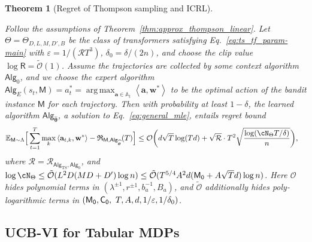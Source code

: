 \documentclass[10pt]{article}
\newtheorem{theorem}{Theorem}
\newcommand{\eps}{\varepsilon}
\DeclareMathOperator*{\argmax}{arg\,max}
\renewcommand{\cO}{\mathcal{O}}
\newcommand{\<}{\left\langle}
\renewcommand{\>}{\right\rangle}
\newcommand{\E}{\mathbb{E}}
\newcommand{\inst}{{\mathsf{M}}}
\newcommand{\TS}{{\mathrm{TS}}}
\newcommand{\Tpspar}{{\lambda}}
\newcommand{\Tpsparn}{{r}}
\newcommand{\tcO}{{\tilde{\mathcal O}}}
\newcommand{\state}{{s}}
\newcommand{\action}{{a}}
\newcommand{\totlen}{{T}}
\newcommand{\sAlg}{{\mathsf{Alg}}}
\newcommand{\Numobs}{{n}}
\newcommand{\Parspace}{{\Theta}}
\newcommand{\esttfpar}{{\widehat{\btheta}}}
\newcommand{\prior}{{\Lambda}}
\newcommand{\shortexp}{{E}}
\newcommand{\layer}{{L}}
\newcommand{\hidden}{{D'}}
\newcommand{\head}{{M}}
\newcommand{\clipval}{{\mathsf{R}}}
\newcommand{\embd}{{D}}
\newcommand{\totreward}{{\mathfrak{R}}}
\newcommand{\distratio}{{\mathcal{R}}}
\newcommand{\Numact}{{A}}
\newcommand{\neuron}{{\mathsf{M_0}}}
\newcommand{\weightn}{{{\mathsf{C_0}}}}
\def\sA{{\mathbb{A}}}
\def\btheta{{\boldsymbol \theta}}
\def\ba{{\mathbf a}}
\def\bw{{\mathbf w}}
\begin{document}
\begin{theorem}
[Regret of Thompson sampling and ICRL]\label{thm:ts_linear_regret}





Follow the assumptions of Theorem~\ref{thm:approx_thompson_linear}. Let $\Theta = \Theta_{D, L, M, \hidden, B}$ be the class of transformers satisfying Eq.~\eqref{eq:ts_tf_param-main} with $\eps=1/(\distratio\totlen^3)$,   $\delta_0=\delta/(2n)$, and choose the clip value $\log \clipval = \tcO(1)$. Assume the trajectories are collected by some context algorithm $\sAlg_0$, and we choose the expert algorithm $\sAlg_\shortexp(\state_t,\inst)=\action^*_t=\argmax_{\ba\in\sA_t}\<\ba,\bw^*\>$ to be the optimal action of the bandit instance $\inst$ for each trajectory. Then with probability at least $1-\delta$, the learned algorithm $\sAlg_{\esttfpar}$, a solution to Eq.~\eqref{eq:general_mle}, entails regret bound
\begin{align*}
\E_{\inst\sim\prior}\Big[\sum_{t=1}^\totlen\max_{k}\<\ba_{t,k},\bw^*\>-\totreward_{\inst,\sAlg_\esttfpar}(\totlen)\Big]&\leq \cO \bigg( d\sqrt{T}\log(Td)+ \sqrt{\distratio} \cdot\totlen^2\sqrt{\frac{\log ( \cN_{\Parspace} \totlen/\delta ) }{n} } \bigg), 
\end{align*}
where $\distratio = \distratio_{\sAlg_\TS,\sAlg_0}$, and $\log \cN_{\Parspace} \le \tcO(\layer^2\embd(\head\embd+\hidden)\log \Numobs )  \leq\tcO(\totlen^{5/4}\Numact^2 d(\neuron+\Numact\sqrt{\totlen}d)\log\Numobs)$. Here $\cO$ hides polynomial terms in $(\Tpspar^{\pm1}, \Tpsparn^{\pm1}, b_a^{-1}, B_a)$, and $\tcO$ additionally hides poly-logarithmic terms in   $(\neuron,\weightn,\\~ \totlen, \Numact, d, 1/\eps, 1/\delta_0)$. 
\end{theorem}





\subsection{UCB-VI for Tabular MDPs}\label{sec:Tabular-MDP-statement}
\end{document}
